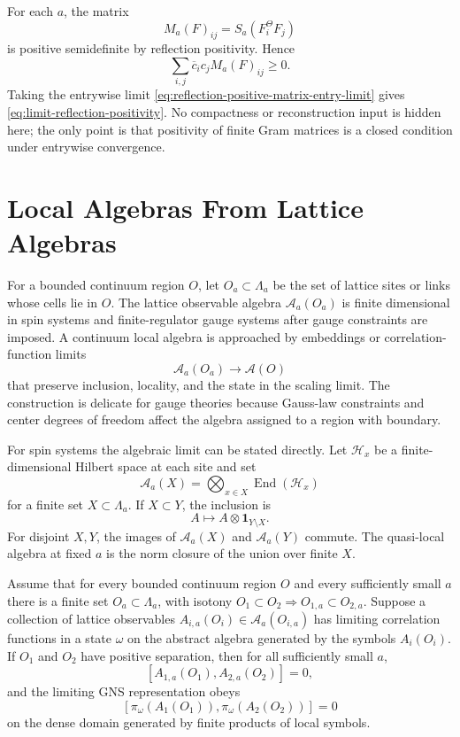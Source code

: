For each \(a\), the matrix
\[
  M_a(F)_{ij}=S_a(F_i^\Theta F_j)
\]
is positive semidefinite by reflection positivity.  Hence
\[
  \sum_{i,j}\overline c_i c_j M_a(F)_{ij}\geq0 .
\]
Taking the entrywise limit
\eqref{eq:reflection-positive-matrix-entry-limit} gives
\eqref{eq:limit-reflection-positivity}.  No compactness or reconstruction
input is hidden here; the only point is that positivity of finite Gram
matrices is a closed condition under entrywise convergence.

\section{Local Algebras From Lattice Algebras}

For a bounded continuum region \(O\), let \(O_a\subset\Lambda_a\) be the set
of lattice sites or links whose cells lie in \(O\).  The lattice observable
algebra \(\mathcal A_a(O_a)\) is finite dimensional in spin systems and
finite-regulator gauge systems after gauge constraints are imposed.  A
continuum local algebra is approached by embeddings or correlation-function
limits
\[
  \mathcal A_a(O_a)\longrightarrow \mathcal A(O)
\]
that preserve inclusion, locality, and the state in the scaling limit.  The
construction is delicate for gauge theories because Gauss-law constraints and
center degrees of freedom affect the algebra assigned to a region with
boundary.

For spin systems the algebraic limit can be stated directly.  Let
\(\mathcal H_x\) be a finite-dimensional Hilbert space at each site and set
\begin{equation}
  \mathcal A_a(X)=\bigotimes_{x\in X}\operatorname{End}(\mathcal H_x)
  \label{eq:finite-region-spin-algebra}
\end{equation}
for a finite set \(X\subset\Lambda_a\).  If \(X\subset Y\), the inclusion is
\[
  A\longmapsto A\otimes \mathbf 1_{Y\setminus X}.
\]
For disjoint \(X,Y\), the images of \(\mathcal A_a(X)\) and
\(\mathcal A_a(Y)\) commute.  The quasi-local algebra at fixed \(a\) is the
norm closure of the union over finite \(X\).

\begin{lemma}
\label{lem:spin-locality-passes-to-gns-limit}
Assume that for every bounded continuum region \(O\) and every sufficiently
small \(a\) there is a finite set \(O_a\subset\Lambda_a\), with isotony
\(O_1\subset O_2\Rightarrow O_{1,a}\subset O_{2,a}\).  Suppose a collection
of lattice observables \(A_{i,a}(O_i)\in\mathcal A_a(O_{i,a})\) has limiting
correlation functions in a state \(\omega\) on the abstract algebra generated
by the symbols \(A_i(O_i)\).  If \(O_1\) and \(O_2\) have positive
separation, then for all sufficiently small \(a\),
\[
  [A_{1,a}(O_1),A_{2,a}(O_2)]=0,
\]
and the limiting GNS representation obeys
\[
  [\pi_\omega(A_1(O_1)),\pi_\omega(A_2(O_2))]=0
  \]
on the dense domain generated by finite products of local symbols.
\end{lemma}

